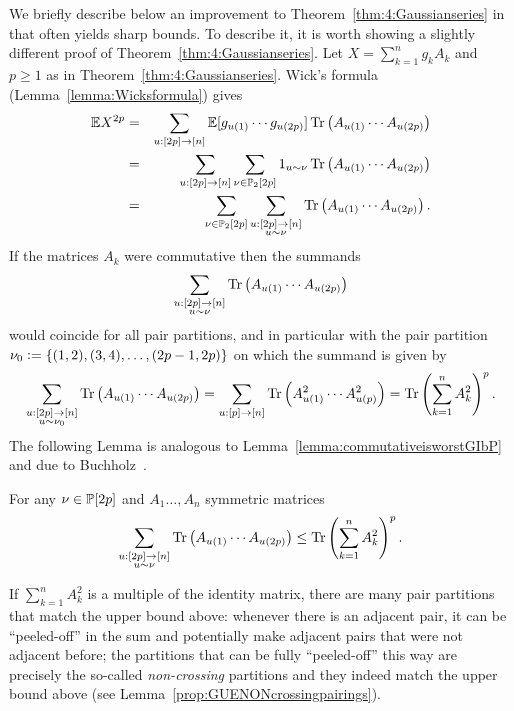 We briefly describe below an improvement to Theorem~\ref{thm:4:Gaussianseries} in~\cite{Bandeiraetal_FreeProbability} that often yields sharp bounds. To describe it,  it is worth showing a slightly different proof of Theorem~\ref{thm:4:Gaussianseries}. Let $X=\sum_{k=1}^ng_kA_k$ and $p\geq 1$ as in Theorem~\ref{thm:4:Gaussianseries}. Wick's formula (Lemma~\ref{lemma:Wicksformula}) gives
\begin{eqnarray*}
\mathbb{E} X^{2p} &=& \sum_{u:[2p]\to[n]} \mathbb{E}[g_{u(1)}\cdots g_{u(2p)}] \operatorname{Tr}\left(A_{u(1)}\cdots A_{u(2p)}\right) \\
&=& \sum_{u:[2p]\to[n]} \sum_{\nu\in \mathbb{P}_2[2p]} 1_{u \sim \nu}\operatorname{Tr}\left(A_{u(1)}\cdots A_{u(2p)}\right) \\
&=& \sum_{\nu\in \mathbb{P}_2[2p]}\sum_{\substack{u:[2p]\to[n] \\ u\sim\nu} } \operatorname{Tr}\left(A_{u(1)}\cdots A_{u(2p)}\right).
\end{eqnarray*}
If the matrices $A_k$ were commutative then the summands 
$$\sum_{\substack{u:[2p]\to[n] \\ u\sim\nu} } \operatorname{Tr}\left(A_{u(1)}\cdots A_{u(2p)}\right)$$ would coincide for all pair partitions, and in particular with the pair partition $\nu_0 \mathrel{\mathop:}= \{(1,2),(3,4),\dots,(2p-1,2p)\}$ on which the summand is given by
\[
\sum_{\substack{u:[2p]\to[n] \\ u\sim\nu_0} } \operatorname{Tr}\left(A_{u(1)}\cdots A_{u(2p)}\right) = \sum_{\substack{u:[p]\to[n] } } \operatorname{Tr}\left(A_{u(1)}^2\cdots A_{u(p)}^2\right)=\operatorname{Tr}\left( \sum_{k=1}^n A_k^2\right)^p.
\]
The following Lemma is analogous to Lemma~\ref{lemma:commutativeisworstGIbP} and due to Buchholz~\cite{Buchholz01}.

\begin{lemma}\label{lemma:commutativeisworstWicks}
For any $\nu\in\mathbb{P}[2p]$ and $A_1\dots,A_{n}$ symmetric matrices
\[
\sum_{\substack{u:[2p]\to[n] \\ u\sim\nu} } \operatorname{Tr}\left(A_{u(1)}\cdots A_{u(2p)}\right) \leq \operatorname{Tr}\left( \sum_{k=1}^n A_k^2\right)^p.
\]
\end{lemma}

If $\sum_{k=1}^n A_k^2$ is a multiple of the identity matrix, there are many pair partitions that match the upper bound above: whenever there is an adjacent pair, it can be ``peeled-off'' in the sum and potentially make adjacent pairs that were not adjacent before; the partitions that can be fully ``peeled-off'' this way are precisely the so-called \emph{non-crossing} partitions and they indeed match the upper bound above (see Lemma~\ref{prop:GUENONcrossingpairings}).

